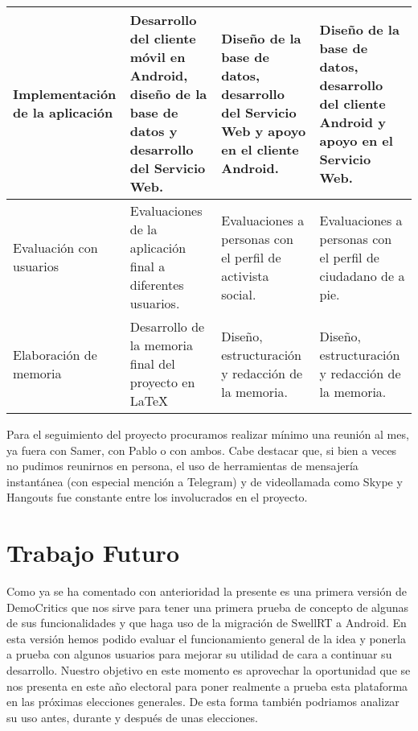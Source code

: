 \begin{table}[!]
\begin{sideways}
\begin{tabular}{|m{3cm}|m{5.5cm}|m{5cm}|m{5cm}|}
Implementación de la aplicación & Desarrollo del cliente móvil en Android, diseño de la base de datos y desarrollo del Servicio Web. & Diseño de la base de datos, desarrollo del Servicio Web y apoyo en el cliente Android. & Diseño de la base de datos, desarrollo del cliente Android y apoyo en el Servicio Web. \\ \hline
Evaluación con usuarios & Evaluaciones de la aplicación final a diferentes usuarios.                 & Evaluaciones a personas con el perfil de activista social.                                                                         & Evaluaciones a personas con el perfil de ciudadano de a pie.                                                 \\ \hline
Elaboración de memoria & Desarrollo de la memoria final del proyecto en \LaTeX\.                                                        & Diseño, estructuración y redacción de la memoria.                                                                                  & Diseño, estructuración y redacción de la memoria.                                                            \\ \hline
\end{tabular}
\end{sideways}
\end{table}

Para el seguimiento del proyecto procuramos realizar mínimo una reunión al mes, ya fuera con Samer, con Pablo o con ambos. Cabe destacar que, si bien a veces no pudimos reunirnos en persona, el uso de herramientas de mensajería instantánea (con especial mención a Telegram) y de videollamada como Skype y Hangouts fue constante entre los involucrados en el proyecto.

\section{Trabajo Futuro}

Como ya se ha comentado con anterioridad la presente es una primera versión de DemoCritics que nos sirve para tener una primera prueba de concepto de algunas de sus funcionalidades y que haga uso de la migración de SwellRT a Android. En esta versión hemos podido evaluar el funcionamiento general de la idea y ponerla a prueba con algunos usuarios para mejorar su utilidad de cara a continuar su desarrollo. Nuestro objetivo en este momento es aprovechar la oportunidad que se nos presenta en este año electoral para poner realmente a prueba esta plataforma en las próximas elecciones generales. De esta forma también podriamos analizar su uso antes, durante y después de unas elecciones.

